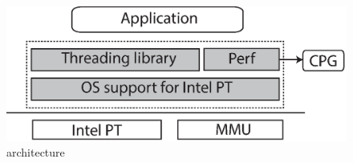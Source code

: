 
\begin{figure}[t]

\centering
      \includegraphics[scale=.3]{figure/System-basic-architecture}
  \caption{\projecttitle architecture}
   
  \label{fig:basicSystem}

\end{figure}

